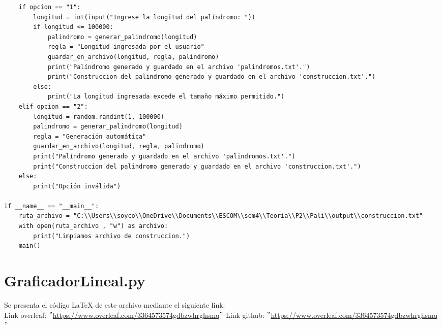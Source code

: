 \begin{lstlisting}
    if opcion == "1":
        longitud = int(input("Ingrese la longitud del palíndromo: "))
        if longitud <= 100000:
            palindromo = generar_palindromo(longitud)
            regla = "Longitud ingresada por el usuario"
            guardar_en_archivo(longitud, regla, palindromo)
            print("Palíndromo generado y guardado en el archivo 'palindromos.txt'.")
            print("Construccion del palindromo generado y guardado en el archivo 'construccion.txt'.")
        else:
            print("La longitud ingresada excede el tamaño máximo permitido.")
    elif opcion == "2":
        longitud = random.randint(1, 100000)
        palindromo = generar_palindromo(longitud)
        regla = "Generación automática"
        guardar_en_archivo(longitud, regla, palindromo)
        print("Palíndromo generado y guardado en el archivo 'palindromos.txt'.")
        print("Construccion del palindromo generado y guardado en el archivo 'construccion.txt'.")
    else:
        print("Opción inválida")

if __name__ == "__main__":
    ruta_archivo = "C:\\Users\\soyco\\OneDrive\\Documents\\ESCOM\\sem4\\Teoria\\P2\\Pali\\output\\construccion.txt"
    with open(ruta_archivo , "w") as archivo:
        print("Limpiamos archivo de construccion.")
    main()

\end{lstlisting}
\section{GraficadorLineal.py}
Se presenta el código LaTeX de este archivo mediante el siguiente link:\newline
\\
Link overleaf: $"$\url{https://www.overleaf.com/3364573574gdbzwhrghsmq}$"$\newline
Link github: $"$\url{https://www.overleaf.com/3364573574gdbzwhrghsmq}$"$\newline
